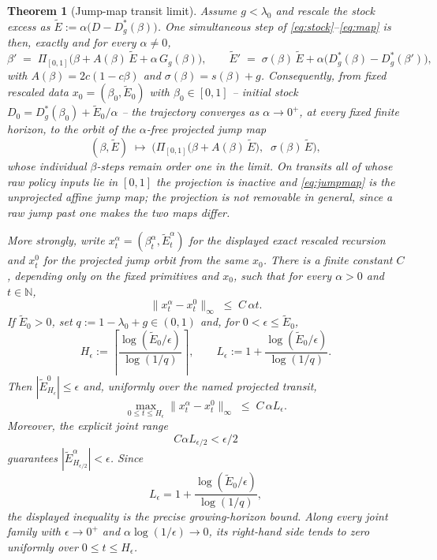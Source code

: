\documentclass[11pt]{article}
\newtheorem{theorem}{Theorem}[section]
\theoremstyle{definition}
\theoremstyle{remark}
\numberwithin{equation}{section}
\begin{document}
\begin{theorem}[Jump-map transit limit]\label{thm:jump}
Assume $g<\lambda_0$ and rescale the stock excess as $\tilde E:=\alpha\bigl(D-D^\ast_g(\beta)\bigr)$. One simultaneous step of \eqref{eq:stock}--\eqref{eq:map} is then, exactly and for every $\alpha \neq 0$,
\[
\beta' \;=\; \Pi_{[0,1]}\bigl(\beta + A(\beta)\,\tilde E + \alpha\,G_g(\beta)\bigr),
\qquad
\tilde E' \;=\; \sigma(\beta)\,\tilde E + \alpha\bigl(D^\ast_g(\beta)-D^\ast_g(\beta')\bigr),
\]
with $A(\beta)=2c(1-c\beta)$ and $\sigma(\beta)=s(\beta)+g$. Consequently, from fixed rescaled data $x_0=(\beta_0,\tilde E_0)$ with $\beta_0\in[0,1]$ -- initial stock $D_0=D^\ast_g(\beta_0)+\tilde E_0/\alpha$ -- the trajectory converges as $\alpha\to0^+$, at every fixed finite horizon, to the orbit of the $\alpha$-free \emph{projected jump map}
\begin{equation}\label{eq:jumpmap}
(\beta,\tilde E)\;\longmapsto\;\bigl(\Pi_{[0,1]}\bigl(\beta + A(\beta)\,\tilde E\bigr),\;\;\sigma(\beta)\,\tilde E\bigr),
\end{equation}
whose individual $\beta$-steps remain order one in the limit. On transits all of whose raw policy inputs lie in $[0,1]$ the projection is inactive and \eqref{eq:jumpmap} is the unprojected affine jump map; the projection is not removable in general, since a raw jump past one makes the two maps differ.

More strongly, write $x_t^\alpha=(\beta_t^\alpha,\tilde E_t^\alpha)$ for the displayed exact rescaled recursion and $x_t^0$ for the projected jump orbit from the same $x_0$. There is a finite constant $C$, depending only on the fixed primitives and $x_0$, such that for every $\alpha>0$ and $t\in\mathbb N$,
\[
\lVert x_t^\alpha-x_t^0\rVert_\infty \;\le\; C\,\alpha t.
\]
If $\tilde E_0>0$, set $q:=1-\lambda_0+g\in(0,1)$ and, for $0<\epsilon\le\tilde E_0$,
\[
H_\epsilon:=\left\lceil\frac{\log(\tilde E_0/\epsilon)}{\log(1/q)}\right\rceil,
\qquad
L_\epsilon:=1+\frac{\log(\tilde E_0/\epsilon)}{\log(1/q)}.
\]
Then $|\tilde E^0_{H_\epsilon}|\le\epsilon$ and, uniformly over the named projected transit,
\[
\max_{0\le t\le H_\epsilon}\lVert x_t^\alpha-x_t^0\rVert_\infty
\;\le\; C\,\alpha L_\epsilon.
\]
Moreover, the explicit joint range
\[
C\alpha L_{\epsilon/2}<\epsilon/2
\]
guarantees $|\tilde E^\alpha_{H_{\epsilon/2}}|<\epsilon$.  Since
\[
L_\epsilon=1+\frac{\log(\tilde E_0/\epsilon)}{\log(1/q)},
\]
the displayed inequality is the precise growing-horizon bound.  Along every
joint family with $\epsilon\to0^+$ and
$\alpha\log(1/\epsilon)\to0$, its right-hand side tends to zero uniformly over
$0\le t\le H_\epsilon$.
\end{theorem}
\end{document}
